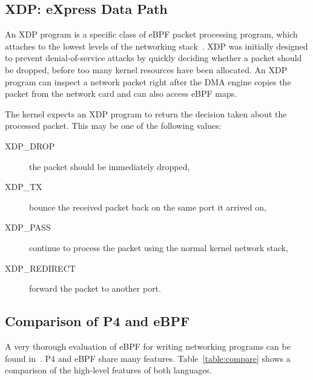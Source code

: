 \subsection{XDP: eXpress Data Path}\label{sec:xdp-background}

An XDP program is a specific class of eBPF packet processing program, which 
attaches to the lowest levels of the networking
stack~\cite{xdpconext18}.  XDP was initially designed to prevent 
denial-of-service attacks by quickly deciding whether a packet should be 
dropped, before too many kernel resources have been allocated. An XDP program 
can inspect a network packet right after the DMA engine copies the packet
from the network card and can also access eBPF maps.

The kernel expects an XDP program to return the decision taken about the 
processed packet. This may be one of the following values:

\begin{description}
\item[XDP\_DROP] the packet should be immediately dropped,
\item[XDP\_TX] bounce the received packet back on the same port it arrived on,
\item[XDP\_PASS] continue to process the packet using the normal kernel network 
stack,
\item[XDP\_REDIRECT] forward the packet to another port.
\end{description}

\subsection{Comparison of P4 and eBPF}

A very thorough evaluation of eBPF for writing networking programs can
be found in~\cite{minao-hspr18}.  P4 and eBPF share many features.
Table~\ref{table:compare} shows a comparison of the high-level
features of both languages.

